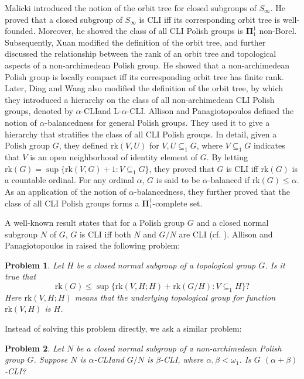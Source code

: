 \documentclass[11pt]{amsart}
\newtheorem{problem}{Problem}
\theoremstyle{definition}
\theoremstyle{remark}
\numberwithin{equation}{section}
\def\hier#1{$#1$-CLI}
\def\rk{\mathrm{rk}}
\begin{document}
Malicki \cite{malicki11} introduced the notion of the orbit tree for closed subgroups of $S_\infty$.
He proved that a closed subgroup of $S_\infty$ is CLI iff its corresponding orbit tree is well-founded.
Moreover, he showed the class of all CLI Polish groups is $\pmb{\Pi}_1^1$ non-Borel.
Subsequently, Xuan \cite{xuan} modified the definition of the orbit tree, and further discussed the relationship between the rank of an orbit tree and topological aspects of a non-archimedean Polish group. He showed that a non-archimedean Polish group is locally compact iff its corresponding orbit tree has finite rank.
Later, Ding and Wang \cite{DingW} also modified the definition of the orbit tree, by which they introduced a hierarchy on the class of all non-archimedean CLI Polish groups, denoted by \hier\alpha\space and L-\hier\alpha.
Allison and Panagiotopoulos \cite{SAllisonAPana} defined the notion of $\alpha$-balancedness for general Polish groups.
They used it to give a hierarchy that stratifies the class of all CLI Polish groups. In detail, given a Polish group $G$, they defined $\rk(V,U)$ for $V,U\subseteq_1 G$, where $V\subseteq_1 G$ indicates that $V$ is an open neighborhood of identity element of $G$. By letting $\rk(G)=\sup\{\rk(V,G)+1:V\subseteq_1 G\}$, they proved that $G$ is CLI iff $\rk(G)$ is a countable ordinal. For any ordinal $\alpha$, $G$ is said to be $\alpha$-balanced if $\rk(G)\le\alpha$. As an application of the notion of $\alpha$-balancedness, they further proved that the class of all CLI Polish groups forms a $\pmb{\Pi}_1^1$-complete set.


A well-known result states that for a Polish group $G$ and a closed normal subgroup $N$ of $G$, $G$ is CLI iff both $N$ and $G/N$ are CLI (cf. \cite[Theorem 2.2]{gao98}). Allison and Panagiotopoulos in \cite{SAllisonAPana} raised the following problem:

\begin{problem}
    Let $H$ be a closed normal subgroup of a topological group $G$. Is it true that
    \begin{equation*}
        \rk(G)\leq\sup\{\rk(V,H;H)+\rk(G/H):V\subseteq_1H\}?
    \end{equation*}
Here $\rk(V,H;H)$ means that the underlying topological group for function $\rk(V,H)$ is $H$.
\end{problem}

Instead of solving this problem directly, we ask a similar problem:

\begin{problem}
    Let $N$ be a closed normal subgroup of a non-archimedean Polish group $G$. Suppose $N$ is \hier\alpha\space and $G/N$ is \hier\beta, where $\alpha,\beta<\omega_1$. Is $G$ \hier{(\alpha+\beta)}?
\end{problem}
\end{document}
